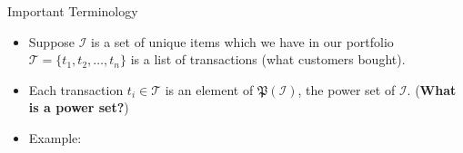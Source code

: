 \begin{frame}
\end{frame}


\begin{dwHeaderFrame}{Important Terminology}
	\begin{itemize}
		\item Suppose $\mathcal{I}$ is a set of unique items which we have in our portfolio
			$\mathcal{T} = \{ t_1, t_2, \dots, t_n \}$ is a list of transactions (what customers bought).
		\item Each transaction $t_i \in \mathcal{T}$ is an element of $\mathfrak{P}(\mathcal{I})$, the power set of $\mathcal{I}$. (\textbf{What is a power set?})
		\item Example:
	\end{itemize}
\end{dwHeaderFrame}


